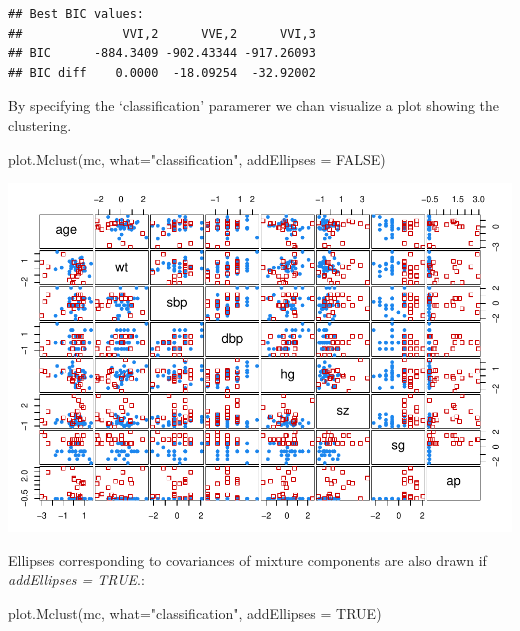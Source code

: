 \documentclass[
]{article}
\newenvironment{Shaded}{\begin{snugshade}}{\end{snugshade}}
\newcommand{\AttributeTok}[1]{\textcolor[rgb]{0.77,0.63,0.00}{#1}}
\newcommand{\ConstantTok}[1]{\textcolor[rgb]{0.00,0.00,0.00}{#1}}
\newcommand{\FunctionTok}[1]{\textcolor[rgb]{0.00,0.00,0.00}{#1}}
\newcommand{\NormalTok}[1]{#1}
\newcommand{\SpecialCharTok}[1]{\textcolor[rgb]{0.00,0.00,0.00}{#1}}
\newcommand{\StringTok}[1]{\textcolor[rgb]{0.31,0.60,0.02}{#1}}
\begin{document}
\begin{Shaded}
\end{Shaded}

\begin{verbatim}
## Best BIC values:
##              VVI,2      VVE,2      VVI,3
## BIC      -884.3409 -902.43344 -917.26093
## BIC diff    0.0000  -18.09254  -32.92002
\end{verbatim}

By specifying the `classification' paramerer we chan visualize a plot
showing the clustering.

\begin{Shaded}
\begin{Highlighting}[]
\FunctionTok{plot.Mclust}\NormalTok{(mc, }\AttributeTok{what=}\StringTok{"classification"}\NormalTok{, }\AttributeTok{addEllipses =} \ConstantTok{FALSE}\NormalTok{)}
\end{Highlighting}
\end{Shaded}

\includegraphics{clustering_files/figure-latex/unnamed-chunk-81-1.pdf}

Ellipses corresponding to covariances of mixture components are also
drawn if \emph{addEllipses = TRUE}.:

\begin{Shaded}
\begin{Highlighting}[]
\FunctionTok{plot.Mclust}\NormalTok{(mc, }\AttributeTok{what=}\StringTok{"classification"}\NormalTok{, }\AttributeTok{addEllipses =} \ConstantTok{TRUE}\NormalTok{)}
\end{Highlighting}
\end{Shaded}
\end{document}
